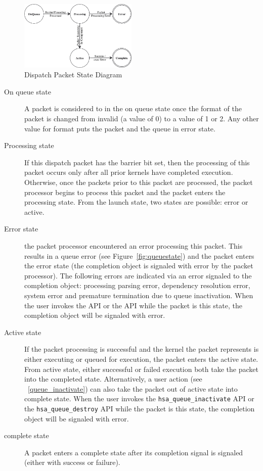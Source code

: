 \begin{figure}
  \centering
  \includegraphics[width=0.5\textwidth] {packetstate}
  \centering
  \caption{Dispatch Packet State Diagram}
  \label{fig:packetstate}
\end{figure}

\begin{description}
\item[On queue state] A packet is considered to in the on queue
state once the format of the packet is changed from invalid (a value
of 0) to a value of 1 or 2. Any other value for format puts the
packet and the queue in error state.

\item[Processing state] If this dispatch packet has the barrier bit
set, then the processing of this packet occurs only after all prior
kernels have completed execution.  Otherwise, once the packets prior
to this packet are processed, the packet processor begins to process
this packet and the packet enters the processing state.  From the
launch state, two states are possible: error or active.

\item[Error state] the packet processor encountered an error
processing this packet. This results in a queue error (see
Figure~\ref{fig:queuestate}) and the packet enters the error state
(the completion object is signaled with error by the packet
processor). The following errors are indicated via an error signaled
to the completion object: 
processing parsing error, dependency resolution error, system error
and premature termination due to queue inactivation.
When the user invokes the
 API or the
 API while the packet is this state, the
completion object will be signaled with error.

\item[Active state] If the packet processing is successful and the
kernel the packet represents is either executing or queued for
execution, the packet enters the active state. From active state,
either successful or failed execution both take the packet into the
completed state.  Alternatively, a user action (see
~\ref{queue_inactivate}) can also take the packet out of
active state into complete state.  When the user invokes the
\texttt{hsa\_queue\_inactivate} API or the
\texttt{hsa\_queue\_destroy} API while the packet is this state, the
completion object will be signaled with error. 

\item[complete state] A packet enters a complete state after its
completion signal is signaled (either with success or failure).
\end{description}

